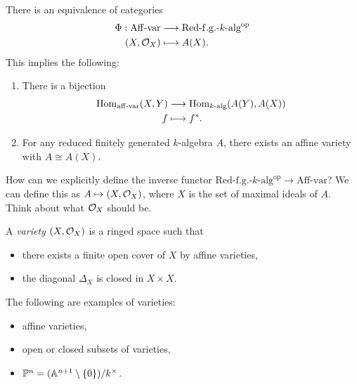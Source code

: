 \begin{theorem}
  There is an equivalence of
  categories
  \begin{align*}
    \Phi :
    \mathrm{Aff\text{-}var}
    &\longrightarrow
  \mathrm{Red\text{-}f.g.\text{-}} k \mathrm{\text{-}alg}^{\mathrm{op}} \\
  (X, \mathcal{O}_X)
    &\longmapsto A(X).
  \end{align*}
  This implies the following:
  \begin{enumerate}
    \item There is a bijection
      \begin{align*}
        \operatorname{Hom}_{\mathrm{aff}\text{-}\mathrm{var}}(X, Y)
        &\longrightarrow
        \operatorname{Hom}_{k\text{-}\mathrm{alg}}(A(Y), A(X)) \\
        f &\longmapsto f^*.
      \end{align*}
    \item For any reduced finitely
      generated $k$-algebra $A$,
      there exists an affine variety
      with $A \cong A(X)$.
  \end{enumerate}
\end{theorem}

\begin{remark}
  How can we explicitly
  define the inverse
  functor
  $
  \mathrm{Red\text{-}f.g.\text{-}} k \mathrm{\text{-}alg}^{\mathrm{op}}
    \rightarrow
  \mathrm{Aff\text{-}var}
  $?
  We can define this as
  $A \mapsto (X, \mathcal{O}_X)$, where
  $X$ is the set of maximal ideals
  of $A$. Think about what
  $\mathcal{O}_X$ should be.
\end{remark}

\begin{remark}[Varieties]
  A \emph{variety} $(X, \mathcal{O}_X)$
  is a ringed space such that
  \begin{itemize}
    \item there exists a finite open
      cover of $X$ by affine varieties,
    \item the diagonal $\Delta_X$ is
      closed in $X \times X$.
  \end{itemize}
\end{remark}

\begin{example}
  The following are examples of
  varieties:
  \begin{itemize}
    \item affine varieties,
    \item open or closed subsets of
      varieties,
    \item $\mathbb{P}^n = (\mathbb{A}^{n + 1} \setminus \{0\}) / k^\times$.
  \end{itemize}
\end{example}

